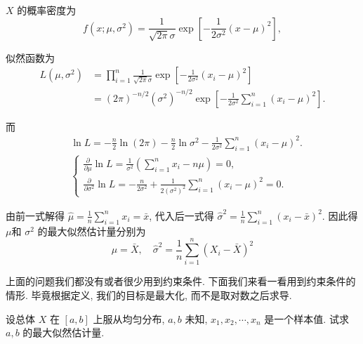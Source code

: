 \begin{solution}
    $X$ 的概率密度为
$$
f\left(x ; \mu, \sigma^2\right)=\frac{1}{\sqrt{2 \pi} \sigma} \exp \left[-\frac{1}{2 \sigma^2}(x-\mu)^2\right],
$$

似然函数为
$$
\begin{aligned}
L\left(\mu, \sigma^2\right) & =\prod_{i=1}^n \frac{1}{\sqrt{2 \pi} \sigma} \exp \left[-\frac{1}{2 \sigma^2}\left(x_i-\mu\right)^2\right] \\
& =(2 \pi)^{-n / 2}\left(\sigma^2\right)^{-n / 2} \exp \left[-\frac{1}{2 \sigma^2} \sum_{i=1}^n\left(x_i-\mu\right)^2\right] .
\end{aligned}
$$

而
$$
\begin{aligned}
& \ln L=-\frac{n}{2} \ln (2 \pi)-\frac{n}{2} \ln \sigma^2-\frac{1}{2 \sigma^2} \sum_{i=1}^n\left(x_i-\mu\right)^2 . \\
& \left\{\begin{array}{l}
\frac{\partial}{\partial \mu} \ln L=\frac{1}{\sigma^2}\left(\sum_{i=1}^n x_i-n \mu\right)=0, \\
\frac{\partial}{\partial \sigma^2} \ln L=-\frac{n}{2 \sigma^2}+\frac{1}{2\left(\sigma^2\right)^2} \sum_{i=1}^n\left(x_i-\mu\right)^2=0 .
\end{array}\right.
\end{aligned}
$$

由前一式解得 $\hat{\mu}=\frac{1}{n} \sum_{i=1}^n x_i=\bar{x}$, 代入后一式得 $\hat{\sigma}^2=\frac{1}{n} \sum_{i=1}^n\left(x_i-\bar{x}\right)^2$. 因此得 $\mu$和 $\sigma^2$ 的最大似然估计量分别为
$$
\hat{\mu}=\bar{X}, \quad \hat{\sigma}^2=\frac{1}{n} \sum_{i=1}^n\left(X_i-\bar{X}\right)^2
$$


\end{solution}

上面的问题我们都没有或者很少用到约束条件. 下面我们来看一看用到约束条件的情形. 毕竟根据定义, 我们的目标是最大化, 而不是取对数之后求导. 

\begin{example}
    设总体 $X$ 在 $[a, b]$ 上服从均匀分布, $a, b$ 未知, $x_1, x_2, \cdots, x_n$ 是一个样本值. 试求 $a, b$ 的最大似然估计量.
   \end{example} 

